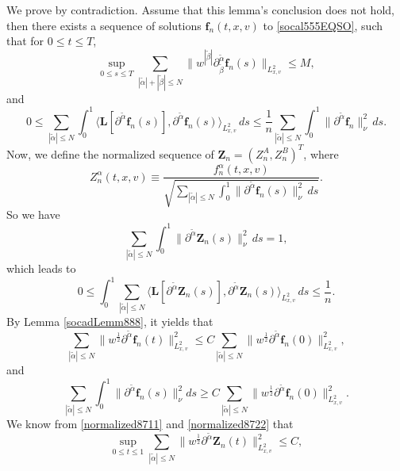 \documentclass[reqno]{amsart}
\numberwithin{equation}{section}
\numberwithin{equation}{section}
\begin{document}
		We prove by contradiction. Assume that this lemma's conclusion does not hold, then there exists a sequence of solutions $ \mathbf{f}_n(t, x, v) $ to \eqref{socal555EQSO}, such that for $ 0 \le t \le T $, 
		\begin{equation*}
			\sup_{0 \le s \le T} \sum_{|\tilde{\alpha}| + |\tilde{\beta}| \leq N} \big\| w^{| \tilde{\beta} |} \partial_{\tilde{\beta}}^{\tilde{\alpha}} \mathbf{f}_n(s)\big\|_{L^{2}_{x,v}} \leq M,
		\end{equation*}
		and
		$$
		0 \leq   \sum_{|\tilde{\alpha}| \leq N} \int_{0}^{1} \big\langle \mathbf{L}[\partial^{\tilde{\alpha}} \mathbf{f}_n (s)], \partial^{\tilde{\alpha}} \mathbf{f}_n (s) \big\rangle_{L^{2}_{x,v}} \, ds\leq \frac{1}{n} \sum_{|\tilde{\alpha}| \le N} \int_0^1 \| \partial^{\tilde{\alpha}} \mathbf{f}_n \|_{\nu}^2\, ds.
		$$
		Now, we define the normalized sequence of $\mathbf{Z}_n=(Z^A_n,Z^B_n)^T$, where
		\begin{equation}\label{normalized8711}
		Z^{\alpha}_n(t, x, v) \equiv \frac{f^{\alpha}_n(t, x, v)}{\sqrt{\sum_{|\tilde{\alpha}| \leq N} \int_0^1 \| \partial^{\tilde{\alpha}} \mathbf{f}_n(s) \|_{\nu}^2 \,ds}}. 
		\end{equation}
		So we have 
		\begin{equation}\label{normalized8722}
			\sum_{|\tilde{\alpha}| \leq N} \int_0^1 \| \partial^{\tilde{\alpha}} \mathbf{Z}_n(s) \|_{\nu}^2 \,ds = 1, 
		\end{equation}
		which leads to
		\begin{equation}\label{normalized888}
		0 \le \int_0^1 \sum_{|\tilde{\alpha}| \leq N} \big\langle \mathbf{L}[\partial^{\tilde{\alpha}} \mathbf{Z}_n (s)], \partial^{\tilde{\alpha}} \mathbf{Z}_n (s) \big\rangle_{L^{2}_{x,v}} \, ds \leq \frac{1}{n}. 
		\end{equation}
		By Lemma \ref{socadLemm888}, it yields that
		$$
		\sum_{|\tilde{\alpha}| \le N} \big\| w^{\frac{1}{2}} \partial^{\tilde{\alpha}} \mathbf{f}_n(t) \big\|_{L^{2}_{x,v}}^2 \le C \sum_{|\tilde{\alpha}| \le N} \big\| w^{\frac{1}{2}} \partial^{\tilde{\alpha}} \mathbf{f}_n(0) \big\|_{L^{2}_{x,v}}^2,
		$$
		and
		$$
		\sum_{|\tilde{\alpha}| \le N} \int_0^1 \big\| \partial^{\tilde{\alpha}} \mathbf{f}_n(s) \big\|_{\nu}^2 ds \ge C \sum_{|\tilde{\alpha}| \leq N} \big\| w^{\frac{1}{2}} \partial^{\tilde{\alpha}} \mathbf{f}_n(0) \big\|_{L^{2}_{x,v}}^2.
		$$
		We know from \eqref{normalized8711} and \eqref{normalized8722} that
		\begin{equation}
		\sup_{0 \le t \le 1} \sum_{|\tilde{\alpha}| \le N} \big\| w^{\frac{1}{2}} \partial^{\tilde{\alpha}} \mathbf{Z}_n(t) \big\|_{L^{2}_{x,v}}^2 \le C, \label{socad8989}
		\end{equation}
\end{document}
